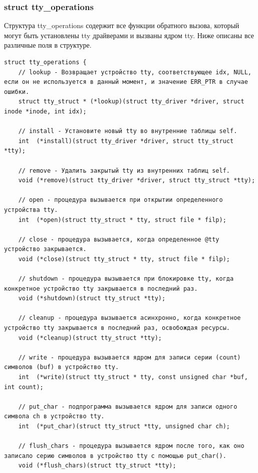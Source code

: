 \subsubsection{struct tty\_operations}

Структура tty\_operations содержит все функции обратного вызова, который могут быть установлены tty драйверами и вызваны ядром tty. Ниже описаны все различные поля в структуре.
\begin{lstlisting}[caption = Описание struct tty\_operations, label = {lst:21}]
struct tty_operations {
    // lookup - Возвращает устройство tty, соответствующее idx, NULL, если он не используется в данный момент, и значение ERR_PTR в случае ошибки.
    struct tty_struct * (*lookup)(struct tty_driver *driver, struct inode *inode, int idx);
    
    // install - Установите новый tty во внутренние таблицы self.
    int  (*install)(struct tty_driver *driver, struct tty_struct *tty);
    
    // remove - Удалить закрытый tty из внутренних таблиц self.
    void (*remove)(struct tty_driver *driver, struct tty_struct *tty);
    
    // open - процедура вызывается при открытии определенного устройства tty.
    int  (*open)(struct tty_struct * tty, struct file * filp);
    
    // close - процедура вызывается, когда определенное @tty устройство закрывается.
    void (*close)(struct tty_struct * tty, struct file * filp);
    
    // shutdown - процедура вызывается при блокировке tty, когда конкретное устройство tty закрывается в последний раз.
    void (*shutdown)(struct tty_struct *tty);
    
    // cleanup - процедура вызывается асинхронно, когда конкретное устройство tty закрывается в последний раз, освобождая ресурсы.
    void (*cleanup)(struct tty_struct *tty);
    
    // write - процедура вызывается ядром для записи серии (count) символов (buf) в устройство tty.
    int  (*write)(struct tty_struct * tty, const unsigned char *buf, int count);
    
    // put_char - подпрограмма вызывается ядром для записи одного символа ch в устройство tty.
    int  (*put_char)(struct tty_struct *tty, unsigned char ch);
    
    // flush_chars - процедура вызывается ядром после того, как оно записало серию символов в устройство tty с помощью put_char(). 
    void (*flush_chars)(struct tty_struct *tty);
    

\end{lstlisting}
